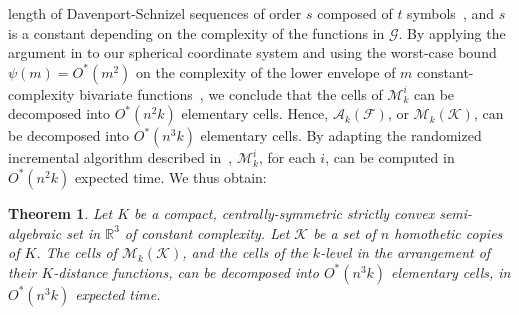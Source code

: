 \documentclass[11pt]{article}
\def\reals{{\mathbb R}}
\def\A{\mathcal{A}}
\def\F{\mathcal{F}}
\def\G{\mathcal{G}}
\def\K{\mathcal{K}}
\def\M{\mathcal{M}}
\newtheorem{theorem}{Theorem}[section]
\theoremstyle{definition}
\begin{document}
length of Davenport-Schnizel sequences of order $s$ composed of $t$ symbols~\cite{SA}, 
and $s$ is a constant depending on the complexity of the functions in $\G$.
By applying the argument in \cite{KMRSS} to our spherical coordinate system and using
the worst-case bound $\psi(m) = O^*(m^2)$ on the complexity of the lower envelope
of $m$ constant-complexity bivariate functions~\cite{SA}, 
we conclude that the cells of $\M_k^i$ can be decomposed into $O^*(n^2k)$ elementary cells. 
Hence, $\A_k(\F)$, or $\M_k(\K)$, can be decomposed into $O^*(n^3k)$ elementary cells. 
By adapting the randomized incremental algorithm described in~\cite{KMRSS}, $\M_k^i$, for each 
$i$, can be computed in $O^*(n^2k)$ expected time. We thus obtain:
%
\begin{theorem} \label{thm:decomp}
Let $K$ be a compact, centrally-symmetric strictly convex semi-algebraic set in $\reals^3$ of constant 
complexity. Let $\K$ be a set of $n$ homothetic copies of $K$. The cells of $\M_k(\K)$, 
and the cells of the $k$-level in the arrangement of their $K$-distance 
functions, can be decomposed into $O^*(n^3k)$ elementary cells, in $O^*(n^3k)$ expected time.
\end{theorem}
%
\end{document}
